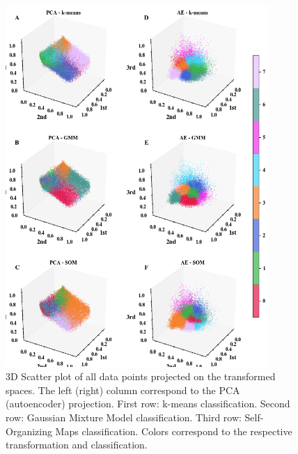 \documentclass[utf8]{frontiersSCNS} %
\begin{document}
\begin{figure}[h!]
	\begin{center}
		\includegraphics[width=10cm]{Amaya/clustering}%
	\end{center}
	\caption{3D Scatter plot of all data points projected on the transformed spaces. The left (right) column correspond to the PCA (autoencoder) projection. First row: k-means classification. Second row: Gaussian Mixture Model classification. Third row: Self-Organizing Maps classification. Colors correspond to the respective transformation and classification.}\label{fig:clustering}
\end{figure}
\end{document}

